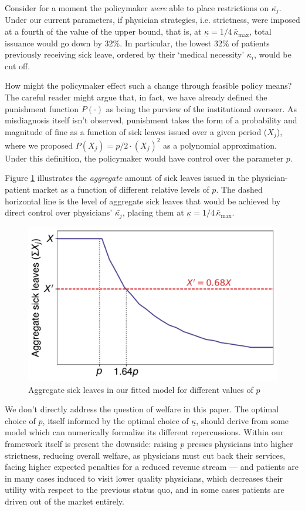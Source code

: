 \documentclass[../main.tex]{subfiles}
\begin{document}
Consider for a moment the policymaker \textit{were} able to place restrictions on $\bar{\kappa_j}$. Under our current parameters, if physician strategies, i.e. strictness, were imposed at a fourth of the value of the upper bound, that is, at $\underline{\kappa} = 1/4 \, \bar{\kappa}_{\max}$, total issuance would go down by 32\%. In particular, the lowest 32\% of patients previously receiving sick leave, ordered by their `medical necessity' $\kappa_i$, would be cut off.

How might the policymaker effect such a change through feasible policy means? The careful reader might argue that, in fact, we have already defined the punishment function $P(\cdot)$ as being the purview of the institutional overseer. As misdiagnosis itself isn't observed, punishment takes the form of a probability and magnitude of fine as a function of sick leaves issued over a given period ($X_j$), where we proposed $P(X_j) = p / 2 \cdot (X_j)^2$ as a polynomial approximation. Under this definition, the policymaker would have control over the parameter $p$.

Figure \ref{fig:counter} illustrates the \textit{aggregate} amount of sick leaves issued in the physician-patient market as a function of different relative levels of $p$. The dashed horizontal line is the level of aggregate sick leaves that would be achieved by direct control over physicians' $\bar{\kappa_j}$, placing them at $\underline{\kappa} = 1/4 \, \bar{\kappa}_{\max}$.

\begin{figure}[H]
    \centering
    \includegraphics[width=0.60\linewidth]{counter.pdf}
    \captionsetup{justification=centerlast}
    \caption{Aggregate sick leaves in our fitted model for different values of $p$}
    \label{fig:counter}
\end{figure}

We don't directly address the question of welfare in this paper. The optimal choice of $p$, itself informed by the optimal choice of $\underline{\kappa}$, should derive from some model which can numerically formalize its different repercussions. Within our framework itself is present the downside: raising $p$ presses physicians into higher strictness, reducing overall welfare, as physicians must cut back their services, facing higher expected penalties for a reduced revenue stream — and patients are in many cases induced to visit lower quality physicians, which decreases their utility with respect to the previous status quo, and in some cases patients are driven out of the market entirely.
\end{document}
